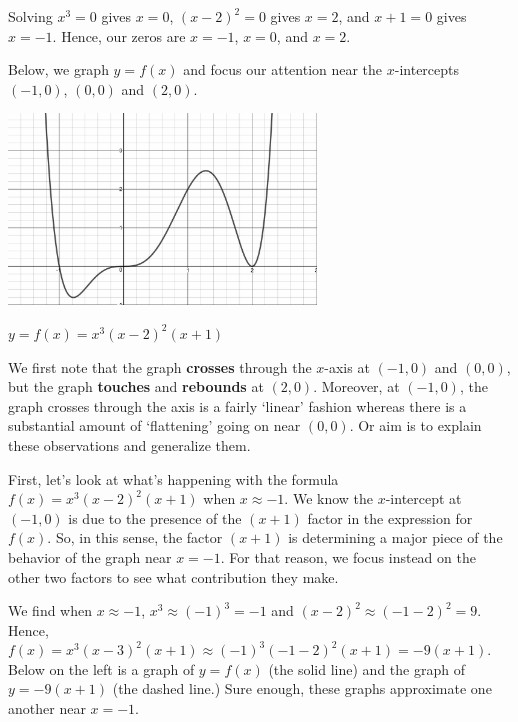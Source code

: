 \documentclass{ximera}
\begin{document}
\medskip

Solving $x^3 = 0$ gives $x = 0$, $(x-2)^2 = 0$ gives $x = 2$, and $x+1 = 0$ gives $x = -1$.  Hence, our zeros are $x = -1$, $x = 0$, and $x = 2$.  

\medskip

Below, we graph $y = f(x)$ and focus our attention near the $x$-intercepts $(-1,0)$, $(0,0)$ and $(2,0)$. 

\begin{center}

\includegraphics[height=2in]{./GraphsofPolynomialsGraphics/PolyZeroEx01.jpg} 

$y = f(x) = x^3 (x-2)^2 (x+1)$

\end{center}


We first note that the graph \textbf{crosses} through the $x$-axis at $(-1,0)$ and $(0,0)$, but the graph \textbf{touches} and \textbf{rebounds} at $(2,0)$.  Moreover, at $(-1,0)$, the graph crosses through the axis is a fairly `linear' fashion whereas there is a substantial amount of `flattening' going on near $(0,0)$.  Or aim is to explain these observations and generalize them.

\medskip

First, let's look at what's happening with the formula  $f(x) =  x^3 (x-2)^2 (x+1)$  when  $x  \approx  -1$.   We know the $x$-intercept at $(-1,0)$ is due to the presence of the $(x+1)$ factor in the expression for $f(x)$.  So, in this sense, the factor $(x+1)$ is determining a major piece of the behavior of the graph near $x = -1$.   For that reason, we focus instead on the other two factors to see what contribution they make. 

\medskip

We find when $x \approx -1$,  $x^3  \approx  (-1)^3 = -1$ and $(x-2)^2 \approx (-1-2)^2 = 9$.  Hence, $f(x) = x^3 (x-3)^2 (x+1) \approx (-1)^3 (-1-2)^2 (x+1) = -9(x+1)$.  Below on the left is a graph of $y = f(x)$ (the solid line) and the graph of $y = -9(x+1)$ (the dashed line.)  Sure enough, these graphs approximate one another near $x = -1$. 
\end{document}
